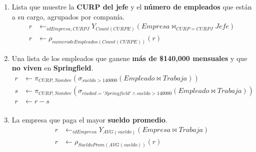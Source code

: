 \documentclass{article}
\begin{document}
\begin{enumerate}
{{\begin{enumerate}
{{                        dos compañías} y el \textbf{número de companías} en que 
                        laboran.
                         \begin{align*}
                         r & \leftarrow _{CURP}Y_{count(idEmpresa)}(Trabaja)\\
                         r & \leftarrow \rho_{numComp(count(idEmpresa))}(r)\\
                         r & \leftarrow \sigma_{numComp > 2}(r)\\
                         \end{align*}
                    }
                    \item {
                        Lista que muestre la \textbf{CURP del jefe} y el
                        \textbf{número de empleados} que están a su cargo,
                        agrupados por companía.
                         \begin{align*}                         
                         r & \leftarrow _{idEmpresa,CURPJ}Y_{Count(CURPE)}(Empresa\bowtie_{CURP = CURPJ} Jefe )\\
                         r & \leftarrow \rho_{numerodeEmpleados(Count(CURPE))}(r)
                         \end{align*}
                    }
                    \item {
                        Una lista de los empleados que ganene \textbf{más de 
                        \$140,000 mensuales} y que \textbf{no viven} en
                        \textbf{Springfield}.
                        \begin{align*}
                        	r & \leftarrow \pi_{CURP,Nombre} (\sigma_{sueldo >140000}(Empleado \bowtie Trabaja))\\
                        	s & \leftarrow \pi_{CURP,Nombre} (\sigma_{ciudad= 'Springfield'\wedge sueldo >140000 }(Empleado \bowtie Trabaja))\\
                        	r & \leftarrow r-s\\                        	
                        \end{align*}
                    }
                    \item {
                        La empresa que paga el mayor \textbf{sueldo promedio}.
                        \begin{align*}
                        	r & \leftarrow _{idEmpresa}Y_{AVG(sueldo)}(Empresa \bowtie Trabaja)\\
                        	r & \leftarrow \rho_{SueldoProm(AVG(sueldo))}(r)\\

\end{align*}}
\end{enumerate}}}
\end{enumerate}
\end{document}
